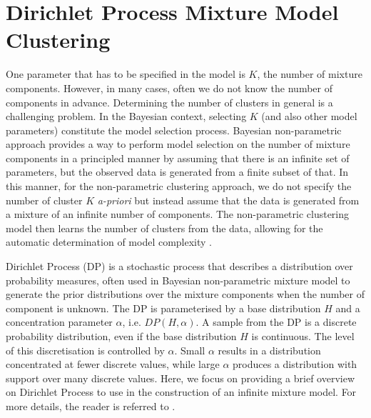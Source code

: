 \section{Dirichlet Process Mixture Model Clustering\label{background-dp-clustering}}

One parameter that has to be specified in the model is $K$, the number of mixture components. However, in many cases, often we do not know the number of components in advance. Determining the number of clusters in general is a challenging problem. In the Bayesian context, selecting $K$ (and also other model parameters) constitute the model selection process. Bayesian non-parametric approach provides a way to perform model selection on the number of mixture components in a principled manner by assuming that there is an infinite set of parameters, but the observed data is generated from a finite subset of that. In this manner, for the non-parametric clustering approach, we do not specify the number of cluster $K$ \emph{a-priori } but instead assume that the data is generated from a mixture of an infinite number of components. The non-parametric clustering model then learns the number of clusters from the data, allowing for the automatic determination of model complexity \cite{hjort2010bayesian}.

Dirichlet Process (DP) \cite{ferguson1973bayesian} is a stochastic process that describes a distribution over probability measures, often used in Bayesian non-parametric mixture model to generate the prior distributions over the mixture components when the number of component is unknown. The DP is parameterised by a base distribution $H$ and a concentration parameter $\alpha$, i.e. $DP(H, \alpha)$. A sample from the DP is a discrete probability distribution, even if the base distribution $H$ is continuous. The level of this discretisation is controlled by $\alpha$. Small $\alpha$ results in a distribution concentrated at fewer discrete values, while large $\alpha$ produces a distribution with support over many discrete values. Here, we focus on providing a brief overview on Dirichlet Process to use in the construction of an infinite mixture model. For more details, the reader is referred to \cite{murphy2012machine, Rasmussen2000, hjort2010bayesian,teh2011dirichlet}. 


